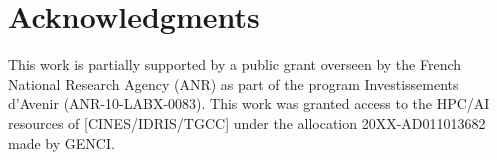 \documentclass{article}
\begin{document}
\section*{Acknowledgments}
 This work is partially supported by a public grant overseen by the French National Research Agency (ANR) as part of the program Investissements d’Avenir (ANR-10-LABX-0083). This work was granted access to the HPC/AI resources of [CINES/IDRIS/TGCC] under the allocation 20XX-AD011013682 made by GENCI.




\appendix
\end{document}
